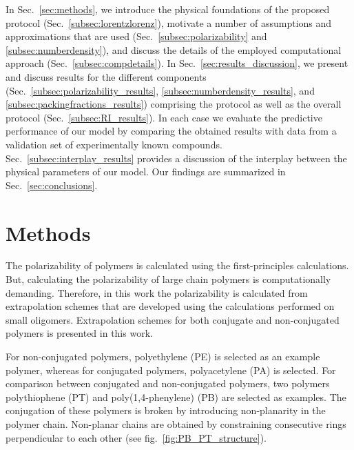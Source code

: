 In Sec.\ \ref{sec:methods}, we introduce the physical foundations of the proposed protocol (Sec.\ \ref{subsec:lorentzlorenz}), 
motivate a number of assumptions and approximations that are used (Sec.\ \ref{subsec:polarizability} and \ref{subsec:numberdensity}), and discuss the details of the employed computational approach (Sec.\ \ref{subsec:compdetails}). In Sec.\ \ref{sec:results_discussion}, we present and discuss results for the different components (Sec.\ \ref{subsec:polarizability_results}, \ref{subsec:numberdensity_results}, and \ref{subsec:packingfractions_results}) comprising the protocol as well as the overall protocol (Sec.\ \ref{subsec:RI_results}). In each case we evaluate the predictive performance of our model by comparing the obtained results with data from a validation set of experimentally known compounds. Sec.\ \ref{subsec:interplay_results} provides a discussion of the interplay between the physical parameters of our model. Our findings are summarized in Sec.\ \ref{sec:conclusions}.



\section{Methods}
\label{sec:methods3}
The polarizability of polymers is calculated using the first-principles calculations. But, calculating the polarizability of large chain polymers is computationally demanding. Therefore, in this work the polarizability is calculated from extrapolation schemes that are developed using the calculations performed on small oligomers. Extrapolation schemes for both conjugate and non-conjugated polymers is presented in this work. 

For non-conjugated polymers, polyethylene (PE) is selected as an example polymer, whereas for conjugated polymers, polyacetylene (PA) is selected. For comparison between conjugated and non-conjugated polymers, two polymers polythiophene (PT) and poly(1,4-phenylene) (PB) are selected as examples. The conjugation of these polymers is broken by introducing non-planarity in the polymer chain. Non-planar chains are obtained by constraining consecutive rings perpendicular to each other (see fig.\ \ref{fig:PB_PT_structure}).

